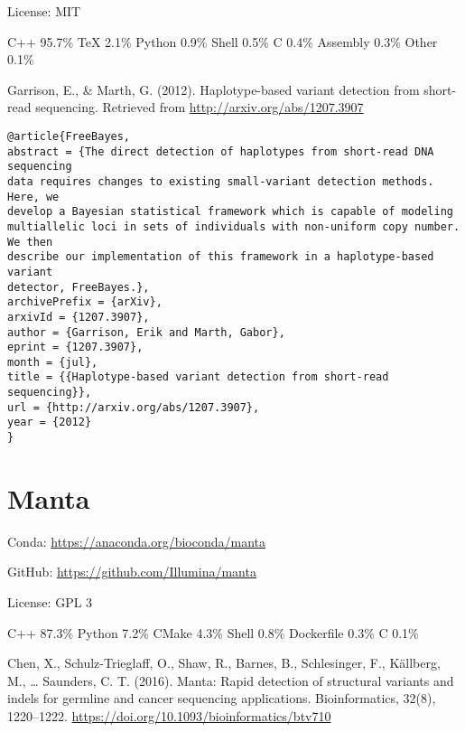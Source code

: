 \documentclass[]{article}
\begin{document}
License: MIT

C++ 95.7\% TeX 2.1\% Python 0.9\% Shell 0.5\% C 0.4\% Assembly 0.3\% Other 0.1\%

Garrison, E., \& Marth, G. (2012). Haplotype-based variant detection from short-read sequencing. Retrieved from \url{http://arxiv.org/abs/1207.3907}

\begin{verbatim}
@article{FreeBayes,
abstract = {The direct detection of haplotypes from short-read DNA sequencing
data requires changes to existing small-variant detection methods. Here, we
develop a Bayesian statistical framework which is capable of modeling
multiallelic loci in sets of individuals with non-uniform copy number. We then
describe our implementation of this framework in a haplotype-based variant
detector, FreeBayes.},
archivePrefix = {arXiv},
arxivId = {1207.3907},
author = {Garrison, Erik and Marth, Gabor},
eprint = {1207.3907},
month = {jul},
title = {{Haplotype-based variant detection from short-read sequencing}},
url = {http://arxiv.org/abs/1207.3907},
year = {2012}
}
\end{verbatim}

\section{Manta}

Conda: \url{https://anaconda.org/bioconda/manta}

GitHub: \url{https://github.com/Illumina/manta}

License: GPL 3

C++ 87.3\% Python 7.2\% CMake 4.3\% Shell 0.8\% Dockerfile 0.3\% C 0.1\%

Chen, X., Schulz-Trieglaff, O., Shaw, R., Barnes, B., Schlesinger, F., Källberg, M., … Saunders, C. T. (2016). Manta: Rapid detection of structural variants and indels for germline and cancer sequencing applications. Bioinformatics, 32(8), 1220–1222. \url{https://doi.org/10.1093/bioinformatics/btv710}
\end{document}
